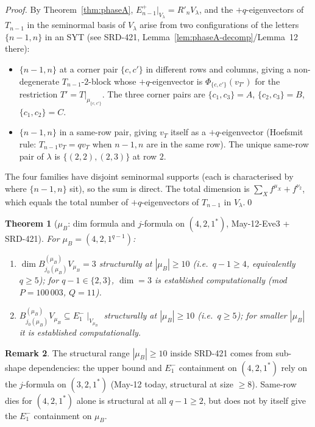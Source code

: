 \documentclass[11pt]{article}
\newtheorem{theorem}{Theorem}
\theoremstyle{definition}
\newtheorem{remark}[theorem]{Remark}
\begin{document}
\begin{proof}
By Theorem~\ref{thm:phaseA}, $E_{n-1}^+|_{V_\lambda} = R'_n V_\lambda$,
and the $+q$-eigenvectors of $T_{n-1}$ in the seminormal basis of
$V_\lambda$ arise from two configurations of the letters $\{n-1, n\}$
in an SYT (see SRD-421, Lemma~\ref{lem:phaseA-decomp}/Lemma~12 there):
\begin{itemize}[leftmargin=2em,topsep=0.2em,itemsep=0.1em]
\item[(i)] $\{n-1, n\}$ at a corner pair $\{c, c'\}$ in different
rows and columns, giving a non-degenerate $T_{n-1}$-$2$-block whose
$+q$-eigenvector is $\Phi_{\{c, c'\}}(v_{T'})$ for the restriction
$T' = T|_{\mu_{\{c, c'\}}}$. The three corner pairs are
$\{c_1, c_3\} = A$, $\{c_2, c_3\} = B$, $\{c_1, c_2\} = C$.
\item[(ii)] $\{n-1, n\}$ in a same-row pair, giving $v_T$ itself as
a $+q$-eigenvector (Hoefsmit rule: $T_{n-1} v_T = q v_T$ when $n-1,
n$ are in the same row). The unique same-row pair of $\lambda$ is
$\{(2, 2), (2, 3)\}$ at row $2$.
\end{itemize}
The four families have disjoint seminormal supports (each is
characterised by where $\{n-1, n\}$ sit), so the sum is direct. The
total dimension is $\sum_X f^{\mu_X} + f^{\nu_2}$, which equals the
total number of $+q$-eigenvectors of $T_{n-1}$ in
$V_\lambda$.\qed
\end{proof}

\begin{theorem}[$\mu_B$: dim formula and $j$-formula on $(4, 2, 1^*)$, May-12-Eve3 + SRD-421]\label{thm:muB}
For $\mu_B = (4, 2, 1^{q-1})$:
\begin{enumerate}[leftmargin=2em,topsep=0.2em,itemsep=0.1em]
\item $\dim B^{(\mu_B)}_{j_0(\mu_B)} V_{\mu_B} = 3$ \emph{structurally}
at $|\mu_B| \ge 10$ (i.e.\ $q - 1 \ge 4$, equivalently $q \ge 5$); for
$q - 1 \in \{2, 3\}$, $\dim = 3$ is established computationally
(mod $P = 100\,003$, $Q = 11$).
\item $B^{(\mu_B)}_{j_0(\mu_B)} V_{\mu_B} \subseteq E_1^-\!\mid_{V_{\mu_B}}$
\emph{structurally} at $|\mu_B| \ge 10$ (i.e.\ $q \ge 5$); for smaller
$|\mu_B|$ it is established computationally.
\end{enumerate}
\end{theorem}

\begin{remark}\label{rem:muB-structural-range}
The structural range $|\mu_B| \ge 10$ inside SRD-421 comes from
sub-shape dependencies: the upper bound and $E_1^-$ containment on
$(4, 2, 1^*)$ rely on the $j$-formula on $(3, 2, 1^*)$ (May-12 today,
structural at size $\ge 8$). Same-row dies for $(4, 2, 1^*)$ alone
is structural at all $q - 1 \ge 2$, but does not by itself give the
$E_1^-$ containment on $\mu_B$.
\end{remark}
\end{document}

